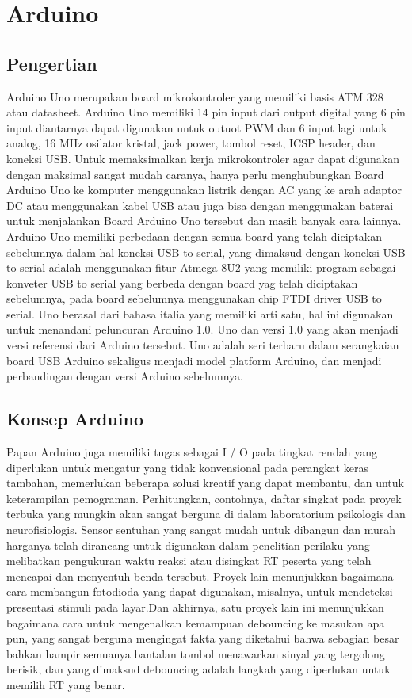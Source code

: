 \section{Arduino}
\subsection{Pengertian}
Arduino Uno merupakan board mikrokontroler yang memiliki basis ATM 328 atau datasheet. Arduino Uno memiliki 14 pin input dari output digital yang 6 pin input diantarnya dapat digunakan untuk outuot PWM dan 6 input lagi untuk analog, 16 MHz osilator kristal, jack power, tombol reset, ICSP header, dan koneksi USB. Untuk memaksimalkan kerja mikrokontroler agar dapat digunakan dengan maksimal sangat mudah caranya, hanya perlu menghubungkan Board Arduino Uno ke komputer menggunakan listrik dengan  AC yang ke arah  adaptor DC atau menggunakan kabel USB atau  juga bisa dengan menggunakan baterai untuk menjalankan Board Arduino Uno tersebut dan masih banyak cara lainnya.
Arduino Uno memiliki perbedaan dengan semua board yang telah diciptakan sebelumnya dalam hal koneksi USB to serial, yang dimaksud dengan koneksi USB to serial adalah menggunakan fitur Atmega 8U2 yang memiliki program sebagai konveter USB to serial yang berbeda dengan board yag telah diciptakan sebelumnya, pada board sebelumnya menggunakan chip FTDI driver USB to serial.
Uno berasal dari bahasa italia yang memiliki arti satu, hal ini digunakan untuk menandani peluncuran Arduino 1.0. Uno dan versi 1.0 yang akan menjadi versi referensi dari Arduino tersebut. Uno adalah seri terbaru dalam serangkaian board USB Arduino sekaligus menjadi model platform Arduino, dan menjadi perbandingan dengan versi Arduino sebelumnya.
\subsection{Konsep Arduino}
Papan Arduino juga memiliki tugas sebagai I / O pada tingkat rendah yang diperlukan untuk mengatur yang tidak konvensional  pada perangkat keras tambahan, memerlukan beberapa solusi kreatif yang dapat membantu, dan untuk keterampilan pemograman. Perhitungkan, contohnya, daftar singkat pada proyek terbuka yang mungkin akan sangat berguna di dalam laboratorium psikologis dan neurofisiologis. Sensor sentuhan yang sangat mudah untuk dibangun dan murah harganya telah dirancang untuk digunakan dalam penelitian perilaku yang melibatkan pengukuran waktu reaksi atau disingkat RT peserta yang telah mencapai dan menyentuh benda tersebut. Proyek lain menunjukkan bagaimana cara membangun fotodioda yang dapat digunakan, misalnya, untuk mendeteksi presentasi stimuli pada layar.Dan akhirnya, satu proyek lain ini menunjukkan bagaimana cara untuk mengenalkan kemampuan debouncing ke masukan apa pun, yang sangat berguna mengingat fakta yang diketahui bahwa sebagian besar bahkan hampir semuanya bantalan tombol menawarkan sinyal yang tergolong berisik, dan yang dimaksud debouncing adalah langkah yang diperlukan untuk memilih RT yang benar.


